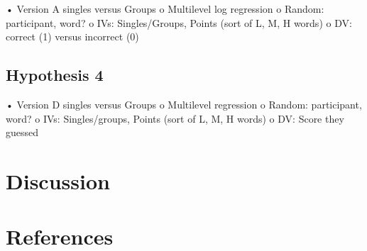 \documentclass[man]{apa6}
\theoremstyle{definition}
\theoremstyle{definition}
\theoremstyle{definition}
\theoremstyle{remark}
\begin{document}
• Version A singles versus Groups o Multilevel log regression o Random:
participant, word? o IVs: Singles/Groups, Points (sort of L, M, H words)
o DV: correct (1) versus incorrect (0)

\hypertarget{hypothesis-4}{%
\subsection{Hypothesis 4}\label{hypothesis-4}}

• Version D singles versus Groups o Multilevel regression o Random:
participant, word? o IVs: Singles/groups, Points (sort of L, M, H words)
o DV: Score they guessed

\hypertarget{discussion}{%
\section{Discussion}\label{discussion}}

\newpage

\hypertarget{references}{%
\section{References}\label{references}}

\begingroup
\setlength{\parindent}{-0.5in}
\setlength{\leftskip}{0.5in}

\hypertarget{refs}{}

\endgroup
\end{document}
